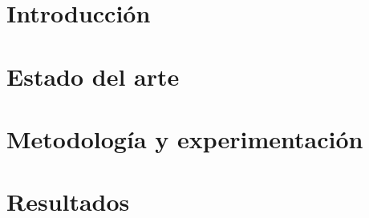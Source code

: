 \documentclass[12pt, a4paper, twoside]{article}
\begin{document}
% 

\clearpage
\setcounter{page}{1}

% 


\newpage



\newpage



\tableofcontents
\listoffigures





\section{Introducción}



\section{Estado del arte}


\section{Metodología y experimentación}


\section{Resultados}

\end{document}

